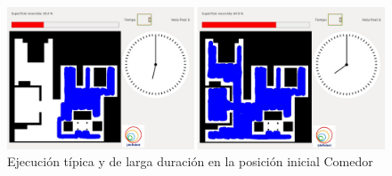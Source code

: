 \begin{figure}[H]
  \begin{center}
    \includegraphics[width=1.0\textwidth]{figures/Vacuum/ejecucionComedor.jpg}
		\caption{Ejecución típica y de larga duración en la posición inicial Comedor}
		\label{fig.ejecucionComedor}
		\end{center}
\end{figure}
